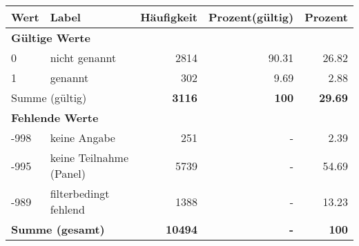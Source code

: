      \begin{longtable}{lXrrr}
     \toprule
     \textbf{Wert} & \textbf{Label} & \textbf{Häufigkeit} & \textbf{Prozent(gültig)} & \textbf{Prozent} \\
     \endhead
     \midrule
     \multicolumn{5}{l}{\textbf{Gültige Werte}}\\

     0 &
     \multicolumn{1}{X}{ nicht genannt   } &


       \num{2814} &
       \num[round-mode=places,round-precision=2]{90.31} &
         \num[round-mode=places,round-precision=2]{26.82} \\

     1 &
     \multicolumn{1}{X}{ genannt   } &


       \num{302} &
       \num[round-mode=places,round-precision=2]{9.69} &
         \num[round-mode=places,round-precision=2]{2.88} \\
     \midrule
     \multicolumn{2}{l}{Summe (gültig)} &
       \textbf{\num{3116}} &
     \textbf{\num{100}} &
       \textbf{\num[round-mode=places,round-precision=2]{29.69}} \\
     \multicolumn{5}{l}{\textbf{Fehlende Werte}}\\
       -998 &
       keine Angabe &
         \num{251} &
        - &
         \num[round-mode=places,round-precision=2]{2.39} \\
       -995 &
       keine Teilnahme (Panel) &
         \num{5739} &
        - &
         \num[round-mode=places,round-precision=2]{54.69} \\
       -989 &
       filterbedingt fehlend &
         \num{1388} &
        - &
         \num[round-mode=places,round-precision=2]{13.23} \\
     \midrule
     \multicolumn{2}{l}{\textbf{Summe (gesamt)}} &
          \textbf{\num{10494}} &
        \textbf{-} &
        \textbf{\num{100}} \\
     \bottomrule
     \end{longtable}
     
